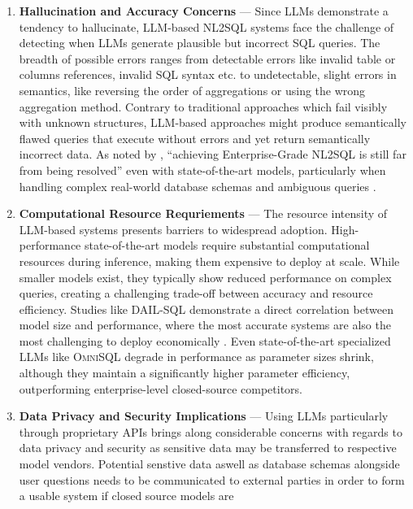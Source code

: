 \begin{enumerate}
    \item \textbf{Hallucination and Accuracy Concerns} — Since LLMs demonstrate a tendency to hallucinate, LLM-based
           NL2SQL systems face the challenge of detecting when LLMs generate plausible but incorrect SQL queries.
           The breadth of possible errors ranges from detectable errors like invalid table or columns references,
           invalid SQL syntax etc. to undetectable, slight errors in semantics, like reversing the order of
           aggregations or using the wrong aggregation method. Contrary to traditional approaches which fail visibly with
           unknown structures, LLM-based approaches might produce semantically flawed queries that execute without
           errors and yet return semantically incorrect data. As noted by \citeauthor{NL2SQLUnsolved}, ``achieving
           Enterprise-Grade NL2SQL is still far from being resolved'' even with state-of-the-art models, particularly
           when handling complex real-world database schemas and ambiguous queries \citep{NL2SQLUnsolved, Spider2}.
    \item \textbf{Computational Resource Requriements} — The resource intensity of LLM-based systems presents barriers
           to widespread adoption. High-performance state-of-the-art models require substantial computational resources
           during inference, making them expensive to deploy at scale. While smaller models exist, they typically show
           reduced performance on complex queries, creating a challenging trade-off between accuracy and resource
           efficiency. Studies like DAIL-SQL demonstrate a direct correlation between model size and performance,
           where the most accurate systems are also the most challenging to deploy economically \citep{DAIL-SQL}.
           Even state-of-the-art specialized LLMs like \textsc{OmniSQL} degrade in performance as parameter sizes
           shrink, although they maintain a significantly higher parameter efficiency, outperforming enterprise-level
           closed-source competitors. 
    \item \textbf{Data Privacy and Security Implications} — Using LLMs particularly through proprietary APIs brings
           along considerable concerns with regards to data privacy and security as sensitive data may be transferred
           to respective model vendors. Potential senstive data aswell as database schemas alongside user questions
           needs to be communicated to external parties in order to form a usable system if closed source models are

\end{enumerate}
